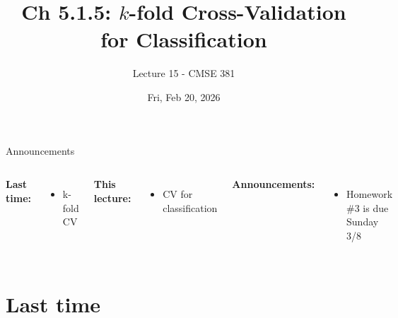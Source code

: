 \documentclass[aspectratio=169,usenames,dvipsnames]{beamer}
\begin{document}
\title[]{Ch 5.1.5: $k$-fold Cross-Validation for Classification}
\subtitle{Lecture 15 - CMSE 381}
\date{Fri, Feb 20, 2026}





\begin{frame}
 \titlepage


\end{frame}
\begin{frame}[c]{Announcements}

\begin{columns}
\centering

	\textbf{Last time:}
	\begin{itemize}
		\item k-fold CV
	\end{itemize}
	\textbf{This lecture:}
	\begin{itemize}
		\item CV for classification
	\end{itemize}

\centering

\textbf{Announcements:}
	\begin{itemize}
		\item Homework \#3 is due Sunday 3/8
	\end{itemize}
\end{columns}

\end{frame}

\section{Last time}
\end{document}
